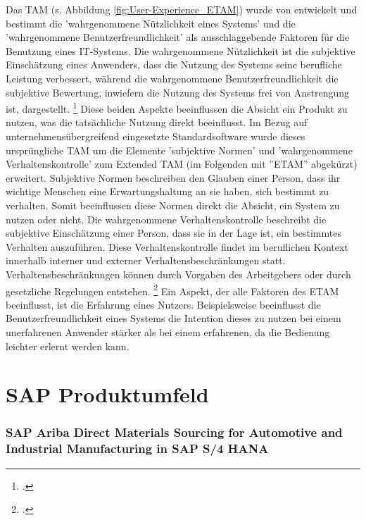 Das TAM (s. Abbildung \ref{fig:User-Experience_ETAM}) wurde von \cite[][]{theorie_davis_tam_1989} entwickelt und bestimmt die 'wahrgenommene Nützlichkeit eines Systems' und die 'wahrgenommene Benutzerfreundlichkeit' als ausschlaggebende Faktoren für die Benutzung eines IT-Systems. Die wahrgenommene Nützlichkeit ist die subjektive Einschätzung eines Anwenders, dass die Nutzung des Systems seine berufliche Leistung verbessert, während die wahrgenommene Benutzerfreundlichkeit die subjektive Bewertung, inwiefern die Nutzung des Systems frei von Anstrengung ist, dargestellt. \footcite[Vgl.][S. 985]{theorie_davis_tam_1989} Diese beiden Aspekte beeinflussen die Absicht ein Produkt zu nutzen, was die tatsächliche Nutzung direkt beeinflusst. Im Bezug auf unternehmensübergreifend eingesetzte Standardsoftware wurde dieses ursprüngliche TAM um die Elemente 'subjektive Normen' und 'wahrgenommene Verhaltenskontrolle' zum Extended TAM (im Folgenden mit ''ETAM'' abgekürzt) erweitert. Subjektive Normen beschreiben den Glauben einer Person, dass ihr wichtige Menschen eine Erwartungshaltung an sie haben, sich bestimmt zu verhalten. Somit beeinflussen diese Normen direkt die Absicht, ein System zu nutzen oder nicht. Die wahrgenommene Verhaltenskontrolle beschreibt die subjektive Einschätzung einer Person, dass sie in der Lage ist, ein bestimmtes Verhalten auszuführen. Diese Verhaltenskontrolle findet im beruflichen Kontext innerhalb interner und externer Verhaltensbeschränkungen statt. Verhaltensbeschränkungen können \zB durch Vorgaben des Arbeitgebers oder durch gesetzliche Regelungen entstehen. \footcite[Vgl.][S. 3f]{theorie_kohnke_extended_tam_2023} Ein Aspekt, der alle Faktoren des ETAM beeinflusst, ist die Erfahrung eines Nutzers. Beispielsweise beeinflusst die Benutzerfreundlichkeit eines Systems die Intention dieses zu nutzen bei einem unerfahrenen Anwender stärker als bei einem erfahrenen, da die Bedienung leichter erlernt werden kann.

\section{SAP Produktumfeld}

\subsubsection{SAP Ariba Direct Materials Sourcing for Automotive and Industrial Manufacturing in SAP S/4 HANA}

